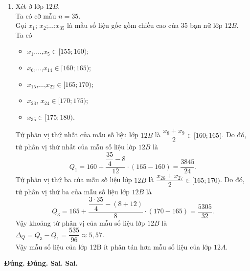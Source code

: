 \begin{ex}
{\begin{enumerate}[1.]
		\item Xét ở lớp $12B$.\\
		Ta có cỡ mẫu $n=35$.\\
		Gọi $x_1 $; $x_2 $;$\ldots $;$x_{35}$ là mẫu số liệu gốc gồm chiều cao của $35$ bạn nữ lớp $12B$.\\
		Ta có
		\begin{itemize}
			\item $x_1$,$\ldots$,$ x_5 \in[155; 160)$;
			\item $x_6$,$\ldots$,$ x_{14} \in[160; 165)$;
			\item $x_{15}$,$\ldots$,$ x_{22} \in[165; 170)$;
			\item $x_{23}$, $x_{24} \in[170; 175)$;
			\item $x_{35} \in[175; 180)$.
		\end{itemize}
		Tứ phân vị thứ nhất của mẫu số liệu lớp $12B$ là $\dfrac{x_8+x_9}{2}\in[160; 165)$. Do đó, tứ phân vị thứ nhất của mẫu số liệu lớp $12B$ là
		$$Q_1=160+\dfrac{\dfrac{35}{4}-8}{12}\cdot(165-160)=\dfrac{3845}{24}.$$
		Tứ phân vị thứ ba của mẫu số liệu lớp $12B$ là $\dfrac{x_{26}+x_{27}}{2}\in[165; 170)$. Do đó, tứ phân vị thứ ba của mẫu số liệu lớp $12B$ là
		$$Q_3=165+\dfrac{\dfrac{3 \cdot 35}{4}-(8+12)}{8}\cdot(170-165)=\dfrac{5305}{32}.$$
		Vậy khoảng tứ phân vị của mẫu số liệu lớp $12B$ là $\Delta_Q=Q_3-Q_1=\dfrac{535}{96} \approx 5{,}57$.\\
		Vậy mẫu số liệu của lớp 12B ít phân tán hơn mẫu số liệu của lớp $12A$.
	\end{enumerate}
	\begin{itemchoice}
		\itemch \textbf{Đúng.}
		\itemch \textbf{Đúng.}
		\itemch \textbf{Sai.}
		\itemch \textbf{Sai.}
	\end{itemchoice}
}
\end{ex}

